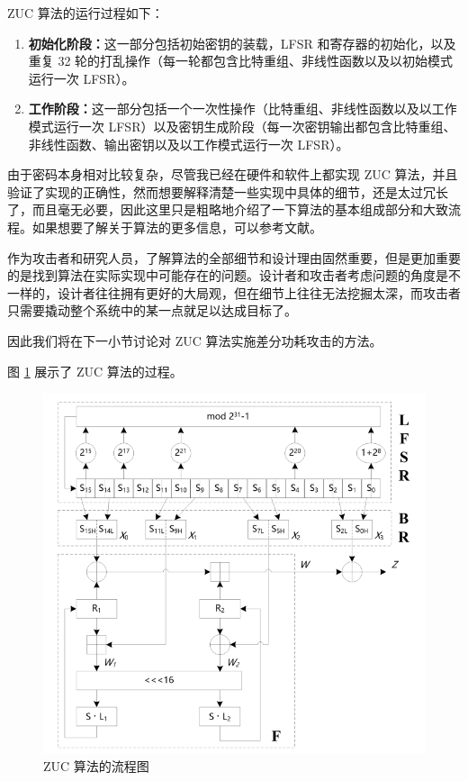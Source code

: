 \vspace*{\baselineskip}

ZUC 算法的运行过程如下：\cite{zuc_standard}

\begin{enumerate}
    \item \textbf{初始化阶段：}这一部分包括初始密钥的装载，LFSR 和寄存器的初始化，以及重复 32 轮的打乱操作（每一轮都包含比特重组、非线性函数以及以初始模式运行一次 LFSR）。
    \item \textbf{工作阶段：}这一部分包括一个一次性操作（比特重组、非线性函数以及以工作模式运行一次 LFSR）以及密钥生成阶段（每一次密钥输出都包含比特重组、非线性函数、输出密钥以及以工作模式运行一次 LFSR）。
\end{enumerate}

\vspace*{\baselineskip}

由于密码本身相对比较复杂，尽管我已经在硬件和软件上都实现 ZUC 算法，并且验证了实现的正确性，然而想要解释清楚一些实现中具体的细节，还是太过冗长了，而且毫无必要，因此这里只是粗略地介绍了一下算法的基本组成部分和大致流程。如果想要了解关于算法的更多信息，可以参考文献\parencite{zuc_standard}。

作为攻击者和研究人员，了解算法的全部细节和设计理由固然重要，但是更加重要的是找到算法在实际实现中可能存在的问题。设计者和攻击者考虑问题的角度是不一样的，设计者往往拥有更好的大局观，但在细节上往往无法挖掘太深，而攻击者只需要撬动整个系统中的某一点就足以达成目标了。

因此我们将在下一小节讨论对 ZUC 算法实施差分功耗攻击的方法。

\vspace*{\baselineskip}

图 \ref{fig:zuc_algo} 展示了 ZUC 算法的过程。

\begin{figure}[htbp]
    \centering
    \includegraphics[height=.5\textheight]{../images/zuc_algo.png}
    \caption{ZUC 算法的流程图\cite{zuc_standard}}
    \label{fig:zuc_algo}
\end{figure}


